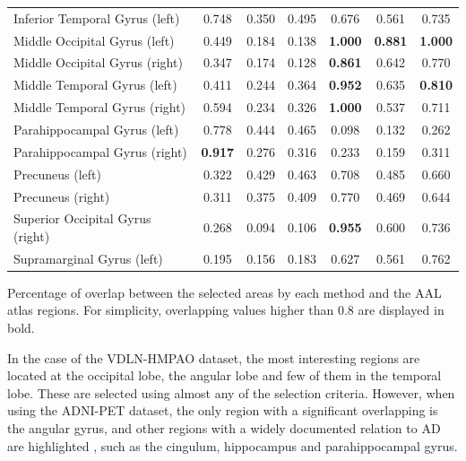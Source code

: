\begin{bigtable}
\begin{tabularx}{\textwidth}{Xcccccc}
Inferior Temporal Gyrus (left)    &    0.748 &    0.350 &  0.495 &      0.676 &    0.561 &  0.735 \\
Middle Occipital Gyrus (left)   &    0.449 &    0.184 &  0.138 &      \textbf{1.000} &    \textbf{0.881} &  \textbf{1.000} \\
Middle Occipital Gyrus (right)   &    0.347 &    0.174 &  0.128 &      \textbf{0.861} &    0.642 &  0.770 \\
Middle Temporal Gyrus (left)    &    0.411 &    0.244 &  0.364 &      \textbf{0.952} &    0.635 &  \textbf{0.810} \\
Middle Temporal Gyrus (right)    &    0.594 &    0.234 &  0.326 &      \textbf{1.000} &    0.537 &  0.711 \\
Parahippocampal Gyrus (left) &    0.778 &    0.444 &  0.465 &      0.098 &    0.132 &  0.262 \\
Parahippocampal Gyrus (right) &    \textbf{0.917} &    0.276 &  0.316 &      0.233 &    0.159 &  0.311 \\
Precuneus (left)       &    0.322 &    0.429 &  0.463 &      0.708 &    0.485 &  0.660 \\
Precuneus (right)       &    0.311 &    0.375 &  0.409 &      0.770 &    0.469 &  0.644 \\
Superior Occipital Gyrus (right)   &    0.268 &    0.094 &  0.106 &      \textbf{0.955} &    0.600 &  0.736 \\
Supramarginal Gyrus (left)   &    0.195 &    0.156 &  0.183 &      0.627 &    0.561 &  0.762 \\
	\bottomrule
\end{tabularx}
\caption[Percentage of overlap between the selected areas by each method and the \acs{AAL} atlas regions.]{Percentage of overlap between the selected areas by each method and the \acs{AAL} atlas regions. For simplicity, overlapping values higher than 0.8 are displayed in bold.}
\label{tab:overlapVDLNAD}
\end{bigtable} 

In the case of the VDLN-HMPAO dataset, the most interesting regions are located at the occipital lobe, the angular lobe and few of them in the temporal lobe. These are selected using almost any of the selection criteria. However, when using the ADNI-PET dataset, the only region with a significant overlapping is the angular gyrus, and other regions with a widely documented relation to \ac{AD} are highlighted \cite{Dubois2007,Claus1994}, such as the cingulum, hippocampus and parahippocampal gyrus. 

